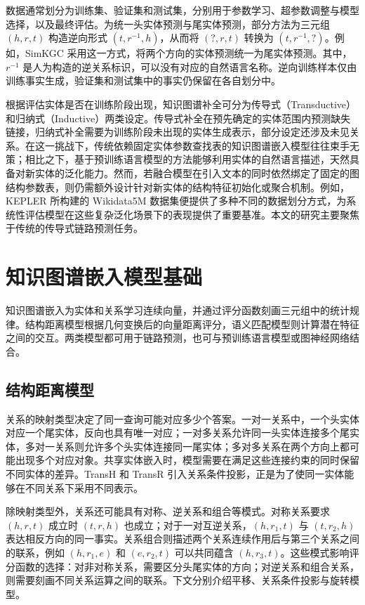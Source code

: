 数据通常划分为训练集、验证集和测试集，分别用于参数学习、超参数调整与模型选择，以及最终评估。为统一头实体预测与尾实体预测，部分方法为三元组 $(h,r,t)$ 构造逆向形式 $(t,r^{-1},h)$，从而将 $(?,r,t)$ 转换为 $(t,r^{-1},?)$。例如，SimKGC 采用这一方式，将两个方向的实体预测统一为尾实体预测\cite{wang2022simkgc}。其中，$r^{-1}$ 是人为构造的逆关系标识，可以没有对应的自然语言名称。逆向训练样本仅由训练事实生成，验证集和测试集中的事实仍保留在各自划分中。

根据评估实体是否在训练阶段出现，知识图谱补全可分为传导式（Transductive）和归纳式（Inductive）两类设定。传导式补全在预先确定的实体范围内预测缺失链接，归纳式补全需要为训练阶段未出现的实体生成表示，部分设定还涉及未见关系。在这一挑战下，传统依赖固定实体参数查找表的知识图谱嵌入模型往往束手无策；相比之下，基于预训练语言模型的方法能够利用实体的自然语言描述，天然具备对新实体的泛化能力。然而，若融合模型在引入文本的同时依然绑定了固定的图结构参数表，则仍需额外设计针对新实体的结构特征初始化或聚合机制。例如，KEPLER 所构建的 Wikidata5M 数据集便提供了多种不同的数据划分方式，为系统性评估模型在这些复杂泛化场景下的表现提供了重要基准\cite{wang2021kepler}。本文的研究主要聚焦于传统的传导式链路预测任务。

\section{知识图谱嵌入模型基础}

知识图谱嵌入为实体和关系学习连续向量，并通过评分函数刻画三元组中的统计规律。结构距离模型根据几何变换后的向量距离评分，语义匹配模型则计算潜在特征之间的交互。两类模型都可用于链路预测，也可与预训练语言模型或图神经网络结合。

\subsection{结构距离模型}

关系的映射类型决定了同一查询可能对应多少个答案。一对一关系中，一个头实体对应一个尾实体，反向也具有唯一对应；一对多关系允许同一头实体连接多个尾实体，多对一关系则允许多个头实体连接同一尾实体；多对多关系在两个方向上都可能出现多个对应对象。共享实体嵌入时，模型需要在满足这些连接约束的同时保留不同实体的差异。TransH 和 TransR 引入关系条件投影，正是为了使同一实体能够在不同关系下采用不同表示\cite{TransH_Wang_2014,TransR_Lin_2015}。

除映射类型外，关系还可能具有对称、逆关系和组合等模式\cite{sun2019rotate}。对称关系要求 $(h,r,t)$ 成立时 $(t,r,h)$ 也成立；对于一对互逆关系，$(h,r_1,t)$ 与 $(t,r_2,h)$ 表达相反方向的同一事实。关系组合则描述两个关系连续作用后与第三个关系之间的联系，例如 $(h,r_1,e)$ 和 $(e,r_2,t)$ 可以共同蕴含 $(h,r_3,t)$。这些模式影响评分函数的选择：对非对称关系，需要区分头尾实体的方向；对逆关系和组合关系，则需要刻画不同关系运算之间的联系。下文分别介绍平移、关系条件投影与旋转模型。

